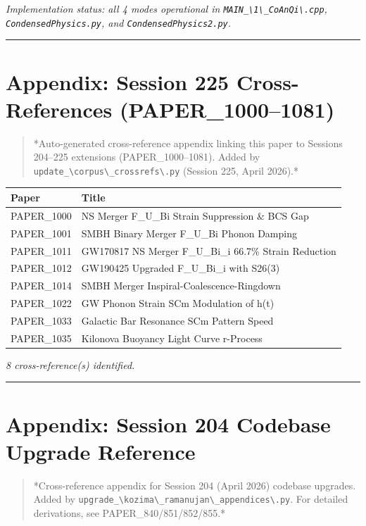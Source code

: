 \documentclass[12pt,a4paper]{article}
\begin{document}
\emph{Implementation status: all 4 modes operational in \texttt{MAIN\_\textbackslash {1\textbackslash \_CoAnQi\textbackslash }.cpp}, \texttt{CondensedPhysics.py}, and \texttt{CondensedPhysics2.py}.}

\medskip\hrule\medskip

\section{Appendix: Session 225 Cross-References (PAPER\_1000--1081)}

\begin{quote}
*Auto-generated cross-reference appendix linking this paper to
Sessions 204--225 extensions (PAPER\_1000--1081). Added by
\texttt{update\_\textbackslash {corpus\textbackslash \_crossrefs\textbackslash }.py} (Session 225, April 2026).*
\end{quote}

\begin{table}[H]
\centering
\small
\begin{tabularx}{\linewidth}{@{}>{\raggedright\arraybackslash}X>{\raggedright\arraybackslash}X@{}}
\toprule
Paper & Title \tabularnewline
\midrule
PAPER\_1000 & NS Merger F\_{U\_Bi} Strain Suppression \& BCS Gap \tabularnewline
PAPER\_1001 & SMBH Binary Merger F\_{U\_Bi} Phonon Damping \tabularnewline
PAPER\_1011 & GW170817 NS Merger F\_{U\_Bi\_i} 66.7\% Strain Reduction \tabularnewline
PAPER\_1012 & GW190425 Upgraded F\_{U\_Bi\_i} with S26(3) \tabularnewline
PAPER\_1014 & SMBH Merger Inspiral-Coalescence-Ringdown \tabularnewline
PAPER\_1022 & GW Phonon Strain SCm Modulation of h(t) \tabularnewline
PAPER\_1033 & Galactic Bar Resonance SCm Pattern Speed \tabularnewline
PAPER\_1035 & Kilonova Buoyancy Light Curve r-Process \tabularnewline
\bottomrule
\end{tabularx}
\end{table}

\emph{8 cross-reference(s) identified.}

\medskip\hrule\medskip

\section{Appendix: Session 204 Codebase Upgrade Reference}

\begin{quote}
*Cross-reference appendix for Session 204 (April 2026) codebase upgrades.
Added by \texttt{upgrade\_\textbackslash {kozima\textbackslash \_ramanujan\textbackslash \_appendices\textbackslash }.py}. For detailed derivations,
see PAPER\_840/851/852/855.*
\end{quote}
\end{document}
